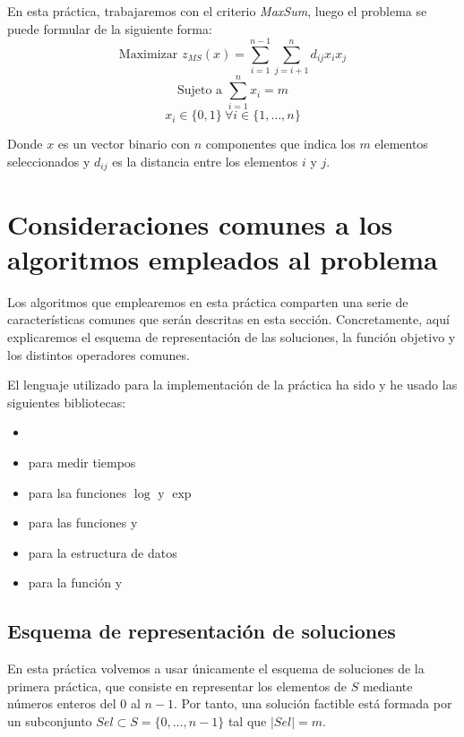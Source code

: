 \documentclass[10pt,a4paper]{article}
\begin{document}
En esta práctica, trabajaremos con el criterio \textit{MaxSum}, luego el problema se puede formular de la siguiente forma:
$$ \text{Maximizar  } z_{MS}(x) = \sum_{i=1}^{n-1} \sum_{j=i+1}^{n} d_{ij} x_i x_j $$
$$ \text{Sujeto a  } \sum_{i=1}^{n} x_i = m $$
$$ x_i \in \{0,1\} \ \forall i \in \{1,\dots,n\} $$

Donde $x$ es un vector binario con $n$ componentes que indica los $m$ elementos seleccionados y $d_{ij}$ es la distancia entre los elementos $i$ y $j$.










\section{Consideraciones comunes a los algoritmos empleados al problema}

Los algoritmos que emplearemos en esta práctica comparten una serie de características comunes que serán descritas en esta sección. Concretamente, aquí explicaremos el esquema de representación de las soluciones, la función objetivo y los distintos operadores comunes.

El lenguaje utilizado para la implementación de la práctica ha sido  y he usado las siguientes bibliotecas:

\begin{itemize}
	\item {}
	\item {} para medir tiempos
	\item {} para lsa funciones $\log$ y $\exp$
	\item {} para las funciones  y 
	\item {} para la estructura de datos 
	\item {} para la función  y 
\end{itemize}


\subsection{Esquema de representación de soluciones}

En esta práctica volvemos a usar únicamente el esquema de soluciones de la primera práctica, que consiste en representar los elementos de $S$ mediante números enteros del $0$ al $n-1$. Por tanto, una solución factible está formada por un subconjunto $Sel \subset S = \{0,\dots,n-1\}$ tal que $|Sel| = m$.
\end{document}
